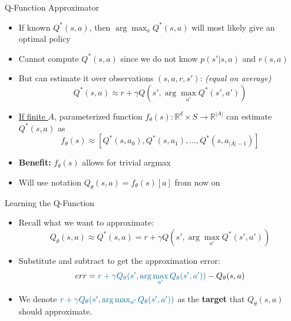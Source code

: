 \documentclass[aspectratio=1609,ADDITIONAL_DOCCLASS_ARGS]{beamer}
\newcommand{\tcolorbf}[2]{\textbf{\textcolor{#1}{#2}}}
\newcommand{\mcolor}[2]{\textcolor{#1}{#2}}
\begin{document}
\begin{frame}{Q-Function Approximator}
  \begin{itemize}
  \setlength\itemsep{2mm}
  \item<1-> If known $Q^*(s,a)$, then $\arg\max_a Q^*(s,a)$ will most likely give an optimal policy
  \item<2-> Cannot compute $Q^*(s,a)$ since we do not know $p(s'|s,a)$ and
        $r(s,a)$
  \item<3-> But can estimate it over observations $(s,a,r,s')$:
        \hspace{1mm} {\scriptsize\em (equal on average)}
        \begin{equation}
        Q^*(s,a) \approx r + \gamma Q(s', \arg\max_{a'} Q^*(s', a'))
        \end{equation}
  \item<4-> \underline{If finite $A$}, parameterized function
        $f_\theta(s) : \mathbb{R}^d \times S \rightarrow \mathbb{R}^{|A|}$
        can estimate $Q^*(s,a)$ as
        \begin{equation}
        f_\theta(s) \approx [Q^*(s,a_0), Q^*(s,a_1), ..., Q^*(s,a_{|A|-1})]
        \end{equation}
  \item<5-> \textbf{Benefit:} $f_\theta(s)$ allows for trivial argmax
  \item<6-> Will use notation $Q_\theta(s,a) = f_\theta(s)[a]$ from now on
  \end{itemize}
\end{frame}

\begin{frame}{Learning the Q-Function}
  \begin{itemize}
  \setlength\itemsep{2mm}
  \item<1-> Recall what we want to approximate:
        \begin{equation}
        Q_\theta(s,a) \approx Q^*(s,a) = r + \gamma Q(s', \arg\max_{a'} Q^*(s', a'))
        \end{equation}
  \item<2-> Substitute and subtract to get the approximation error:
        \begin{equation}
        err =
        \mcolor{mathcolor1}{r + \gamma Q_\theta(s', \arg\max_{a'} Q_\theta(s', a'))}
        - Q_\theta(s,a)
        \end{equation}
  \item<3-> We denote $\mcolor{mathcolor1}{r + \gamma Q_\theta(s', \arg\max_{a'} Q_\theta(s', a'))}$ as the \tcolorbf{mathcolor1}{target} that $Q_\theta(s,a)$ should approximate.
  \end{itemize}
\end{frame}
\end{document}
